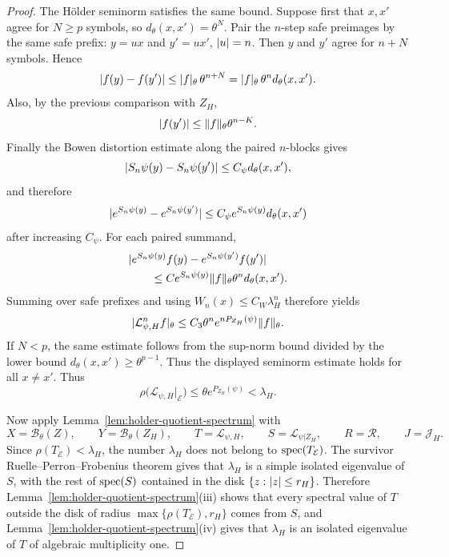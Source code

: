 \begin{proof}
The H\"older seminorm satisfies the same bound.  Suppose first that
\(x,x'\) agree for \(N\geq p\) symbols, so \(d_\theta(x,x')=\theta^N\).
Pair the \(n\)-step safe preimages by the same safe prefix:
\(y=ux\) and \(y'=ux'\), \(\lvert u\rvert=n\).  Then \(y\) and \(y'\) agree for
\(n+N\) symbols.  Hence
\[
  \lvert f(y)-f(y')\rvert
  \leq
  \lvert f\rvert_\theta\,\theta^{n+N}
  =
  \lvert f\rvert_\theta\,\theta^n d_\theta(x,x').
\]
Also, by the previous comparison with \(Z_H\),
\[
  \lvert f(y')\rvert \leq \lVert f\rVert_\theta\theta^{n-K}.
\]
Finally the Bowen distortion estimate along the paired \(n\)-blocks gives
\[
  \lvert S_n\psi(y)-S_n\psi(y')\rvert
  \leq
  C_\psi d_\theta(x,x'),
\]
and therefore
\[
  \lvert e^{S_n\psi(y)}-e^{S_n\psi(y')}\rvert
  \leq
  C_\psi e^{S_n\psi(y)}d_\theta(x,x')
\]
after increasing \(C_\psi\).  For each paired summand,
\[
\begin{aligned}
 &\lvert e^{S_n\psi(y)}f(y)-e^{S_n\psi(y')}f(y')\rvert        \\
 &\qquad\leq
  C e^{S_n\psi(y)}\lVert f\rVert_\theta
  \theta^n d_\theta(x,x').
\end{aligned}
\]
Summing over safe prefixes and using \(W_n(x)\leq C_W\lambda_H^n\)
therefore yields
\[
  \lvert \mathcal L_{\psi,H}^n f\rvert_\theta
  \leq
  C_3\theta^n e^{nP_{Z_H}(\psi)}\lVert f\rVert_\theta .
\]
If \(N<p\), the same estimate follows from the sup-norm bound divided by
the lower bound \(d_\theta(x,x')\geq\theta^{p-1}\).  Thus the displayed
seminorm estimate holds for all \(x\neq x'\).
Thus
\[
  \rho\bigl(\mathcal L_{\psi,H}|_{\mathcal E}\bigr)
  \leq
  \theta e^{P_{Z_H}(\psi)}
  < \lambda_H .
\]

Now apply Lemma~\ref{lem:holder-quotient-spectrum} with
\[
  X=\mathcal B_\theta(Z),\qquad
  Y=\mathcal B_\theta(Z_H),\qquad
  T=\mathcal L_{\psi,H},\qquad
  S=\mathcal L_{\psi|Z_H},\qquad
  R=\mathcal R,\qquad
  J=\mathcal J_H .
\]
Since \(\rho(T_{\mathcal E})<\lambda_H\), the number \(\lambda_H\) does
not belong to \(\operatorname{spec}(T_{\mathcal E})\).  The survivor
Ruelle--Perron--Frobenius theorem gives that \(\lambda_H\) is a simple
isolated eigenvalue of \(S\), with the rest of \(\operatorname{spec}(S)\) contained in
the disk \(\{z:\lvert z\rvert\leq r_H\}\).  Therefore
Lemma~\ref{lem:holder-quotient-spectrum}(iii) shows that every spectral
value of \(T\) outside the disk of radius
\(\max\{\rho(T_{\mathcal E}),r_H\}\) comes from \(S\), and
Lemma~\ref{lem:holder-quotient-spectrum}(iv) gives that \(\lambda_H\) is
an isolated eigenvalue of \(T\) of algebraic multiplicity one.


\end{proof}
